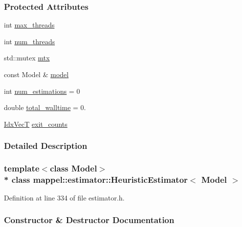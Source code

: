 \subsubsection*{Protected Attributes}
\begin{DoxyCompactItemize}
\item 
int \hyperlink{classmappel_1_1estimator_1_1ThreadedEstimator_ab4c55ecff71dff47c0584ce20fe7f077}{max\+\_\+threads}
\item 
int \hyperlink{classmappel_1_1estimator_1_1ThreadedEstimator_af746a83929a7217b4084d0e10f850bc3}{num\+\_\+threads}
\item 
std\+::mutex \hyperlink{classmappel_1_1estimator_1_1ThreadedEstimator_af78695378590ff8e822dffe2b1b3f242}{mtx}
\item 
const Model \& \hyperlink{classmappel_1_1estimator_1_1Estimator_a2f157410771fb79a20d4d54e505750d0}{model}
\item 
int \hyperlink{classmappel_1_1estimator_1_1Estimator_a9f5390f0ac3ee127ddcd90dc6f4fd889}{num\+\_\+estimations} = 0
\item 
double \hyperlink{classmappel_1_1estimator_1_1Estimator_a98ad459e850aeb2c42c10fd06c3b9fbc}{total\+\_\+walltime} = 0.
\item 
\hyperlink{namespacemappel_ac63743dcd42180127307cd0e4ecdd784}{Idx\+VecT} \hyperlink{classmappel_1_1estimator_1_1Estimator_aa946d9789a1299d684f83a822a10caa7}{exit\+\_\+counts}
\end{DoxyCompactItemize}


\subsubsection{Detailed Description}
\subsubsection*{template$<$class Model$>$\\*
class mappel\+::estimator\+::\+Heuristic\+Estimator$<$ Model $>$}



Definition at line 334 of file estimator.\+h.



\subsubsection{Constructor \& Destructor Documentation}
